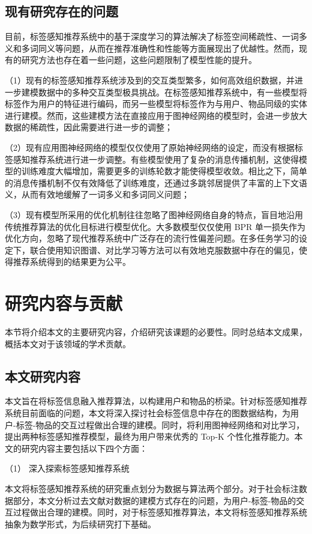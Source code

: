 \subsection{现有研究存在的问题} 
目前，标签感知推荐系统中的基于深度学习的算法解决了标签空间稀疏性、一词多义和多词同义等问题，从而在推荐准确性和性能等方面展现出了优越性。然而，现有的研究方法也存在着一些问题，这些问题限制了模型性能的提升。

（1）现有的标签感知推荐系统涉及到的交互类型繁多，如何高效组织数据，并进一步建模数据中的多种交互类型极具挑战。在标签感知推荐系统中，有一些模型将标签作为用户的特征进行编码\cite{zuo_tag-aware_2016,chen_airec_2021}，而另一些模型将标签作为与用户、物品同级的实体进行建模\cite{zhang_personalized_2010,chen_tgcn_2020}。然而，这些建模方法在直接应用于图神经网络的模型时，会进一步放大数据的稀疏性，因此需要进行进一步的调整；

（2）现有应用图神经网络的模型仅仅使用了原始神经网络的设定，而没有根据标签感知推荐系统进行进一步调整。有些模型使用了复杂的消息传播机制\cite{wang_neural_2019,chen_tgcn_2020}，这使得模型的训练难度大幅增加，需要更多的训练轮数才能使得模型收敛。相比之下，简单的消息传播机制不仅有效降低了训练难度，还通过多跳邻居提供了丰富的上下文语义，从而有效地缓解了一词多义和多词同义问题；

（3）现有模型所采用的优化机制往往忽略了图神经网络自身的特点，盲目地沿用传统推荐算法的优化目标进行模型优化。大多数模型仅仅使用 BPR 单一损失作为优化方向，忽略了现代推荐系统中广泛存在的流行性偏差问题。在多任务学习的设定下，联合使用知识图谱、对比学习等方法可以有效地克服数据中存在的偏见，使得推荐系统得到的结果更为公平。

\section{研究内容与贡献} %
本节将介绍本文的主要研究内容，介绍研究该课题的必要性。同时总结本文成果，概括本文对于该领域的学术贡献。
\subsection{本文研究内容} %
本文旨在将标签信息融入推荐算法，以构建用户和物品的桥梁。针对标签感知推荐系统目前面临的问题，本文将深入探讨社会标签信息中存在的图数据结构，为用户-标签-物品的交互过程做出合理的建模。同时，将利用图神经网络和对比学习，提出两种标签感知推荐模型，最终为用户带来优秀的 Top-K 个性化推荐能力。本文的研究内容主要包括以下四个方面：

（1） 深入探索标签感知推荐系统

本文将标签感知推荐系统的研究重点划分为数据与算法两个部分。对于社会标注数据部分，本文分析过去文献对数据的建模方式存在的问题，为用户-标签-物品的交互过程做出合理的建模。同时，对于标签感知推荐算法，本文将标签感知推荐系统抽象为数学形式，为后续研究打下基础。

